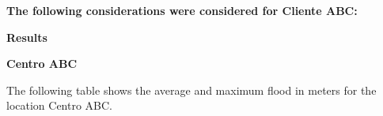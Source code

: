\documentclass[
]{article}
\begin{document}
\newpage

\noindent \textbf{\textcolor{azuloscuro}{\fontsize{11}{13}\selectfont The following considerations were considered for Cliente ABC:}}
\vspace{0.5cm}

\newpage

\newpage

\noindent \textbf{\textcolor{azuloscuro}{\fontsize{28}{32}\selectfont Results}}
\label{sec:results}

\vspace{0.5cm}

\textbf{\textcolor{turquesa}{\fontsize{16}{20}\selectfont Centro ABC}}

\vspace{0.5cm}

\fontsize{11}{13}\selectfont The following table shows the average and
maximum flood in meters for the location Centro ABC.

\vspace{1cm}
\end{document}
